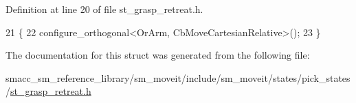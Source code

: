 Definition at line 20 of file st\+\_\+grasp\+\_\+retreat.\+h.


\begin{DoxyCode}
21     \{
22         configure\_orthogonal<OrArm, CbMoveCartesianRelative>();
23     \}
\end{DoxyCode}


The documentation for this struct was generated from the following file\+:\begin{DoxyCompactItemize}
\item 
smacc\+\_\+sm\+\_\+reference\+\_\+library/sm\+\_\+moveit/include/sm\+\_\+moveit/states/pick\+\_\+states/\hyperlink{include_2sm__moveit_2states_2pick__states_2st__grasp__retreat_8h}{st\+\_\+grasp\+\_\+retreat.\+h}\end{DoxyCompactItemize}
